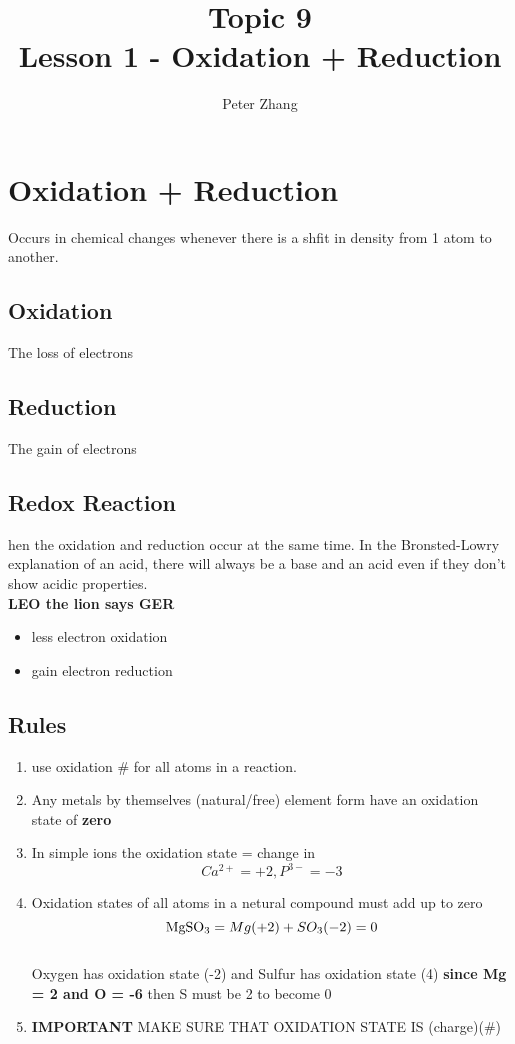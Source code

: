 \documentclass{article}
\title{Topic 9\\Lesson 1 - Oxidation + Reduction}
\author{Peter Zhang}
\begin{document}
\maketitle
\tableofcontents
\newpage

\section{Oxidation + Reduction}
Occurs in chemical changes whenever there is a shfit in  density from 1 atom to another.

\subsection{Oxidation}
The loss of electrons 

\subsection{Reduction}
The gain of electrons 

\subsection{Redox Reaction}
hen the oxidation and reduction occur at the same time. In the Bronsted-Lowry explanation of an acid, there will always be a base and an acid even if they don't show acidic properties.\\

\textbf{LEO the lion says GER}

\begin{itemize}
\item less electron oxidation
\item gain electron reduction
\end{itemize}

\pagebreak
\subsection{Rules}
\begin{enumerate}
\item use oxidation \# for all atoms in a reaction.
\item Any metals by themselves (natural/free) element form have an oxidation state of \textbf{zero}
\item In simple ions the oxidation state = change in \\$$Ca^{2+} = +2, P^{3-} = -3$$
\item Oxidation states of all atoms in a netural compound must add up to zero\\$$\ce{MgSO3} = Mg (+2) + SO_{3}(-2) = 0$$\\Oxygen has oxidation state (-2) and Sulfur has oxidation state (4) \textbf{since Mg = 2 and O = -6} then S must be 2 to become 0
\item  \textbf{IMPORTANT} MAKE SURE THAT OXIDATION STATE IS (charge)(\#)
\end{enumerate}
\end{document}
